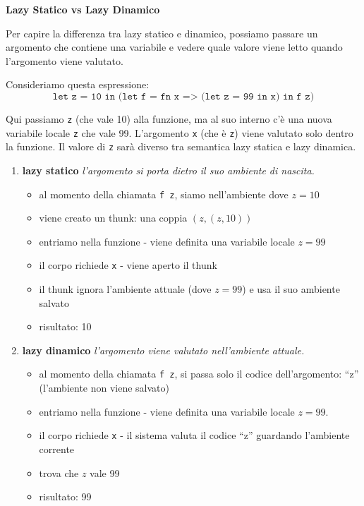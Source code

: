 \documentclass[a4paper,11pt]{report}
\begin{document}
\textbf{Lazy Statico vs Lazy Dinamico}

Per capire la differenza tra lazy statico e dinamico, possiamo passare un argomento che contiene una variabile e vedere quale valore viene letto quando l'argomento viene valutato.

Consideriamo questa espressione:
\[ \texttt{let z = 10 in (let f = fn x => (let z = 99 in x) in f z)} \]

Qui passiamo \texttt{z} (che vale 10) alla funzione, ma al suo interno c'è una nuova variabile locale \texttt{z} che vale 99.
L'argomento \texttt{x} (che è \texttt{z}) viene valutato solo dentro la funzione. Il valore di \texttt{z} sarà diverso tra semantica lazy statica e lazy dinamica.
\vspace{-1em}
\begin{enumerate}
    \item \textbf{lazy statico}
    \textit{l'argomento si porta dietro il suo ambiente di nascita.}
    \begin{itemize}
        \item al momento della chiamata \texttt{f z}, siamo nell'ambiente dove \( z=10 \)
        \item viene creato un thunk: una coppia \( (z, (z,10)) \)
        \item entriamo nella funzione - viene definita una variabile locale \( z=99 \)
        \item il corpo richiede \texttt{x} - viene aperto il thunk
        \item il thunk ignora l'ambiente attuale (dove \( z=99 \)) e usa il suo ambiente salvato
        \item risultato: 10 
    \end{itemize}

    \item \textbf{lazy dinamico}
    \textit{l'argomento viene valutato nell'ambiente attuale.}
    \begin{itemize}
        \item al momento della chiamata \texttt{f z}, si passa solo il codice dell'argomento: ``z'' (l'ambiente non viene salvato) 
        \item entriamo nella funzione - viene definita una variabile locale \( z=99 \).
        \item il corpo richiede \texttt{x} - il sistema valuta il codice ``z'' guardando l'ambiente corrente       
        \item trova che \( z \) vale 99
        \item risultato: 99
    \end{itemize}
\end{enumerate}
\end{document}
